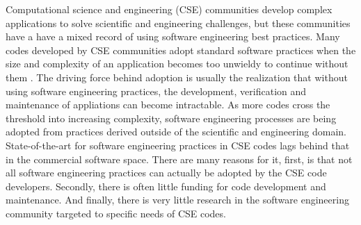 \label{sec:introduction}
Computational science and engineering (CSE) communities develop
complex applications to solve scientific and engineering challenges,
but these communities have a have a mixed record of using software
engineering best practices. Many codes developed by CSE communities
adopt standard software practices when the size and complexity of an
application becomes too unwieldy to continue without them
\cite{cc2012}. The driving force behind adoption is usually the
realization that without using software engineering practices, the
development, verification and maintenance of appliations can become
intractable. As more codes cross the threshold into increasing
complexity, software engineering processes are being adopted from
practices derived outside of the scientific and engineering domain.
State-of-the-art for software engineering practices in CSE codes lags
behind that in the commercial software space.  There are many reasons for it, first, is
that not all software engineering practices can actually be adopted by
the CSE code developers.  Secondly, there is often little funding for
code development and maintenance. And finally, there is very little
research in the software engineering community targeted to specific
needs of CSE codes. 

